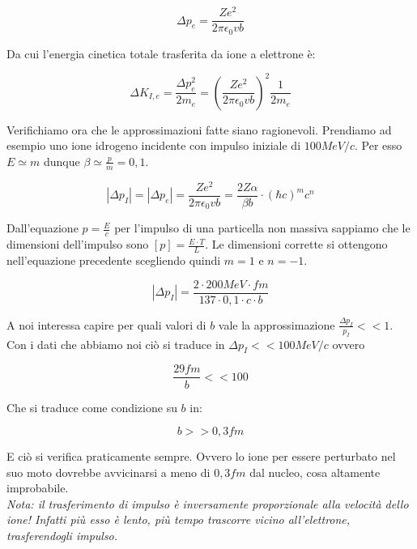 \documentclass [a4paper, twoside] {book}
\begin{document}
\begin{equation}
\Delta p_e=\frac{Ze^2}{2\pi\epsilon_0vb}
\end{equation}

Da cui l'energia cinetica totale trasferita da ione a elettrone è:

\begin{equation}
\Delta K_{I,e}=\frac{\Delta p_e^2}{2m_e}=(\frac{Ze^2}{2\pi\epsilon_0vb})^2\frac{1}{2m_e}
\end{equation}

Verifichiamo ora che le approssimazioni fatte siano ragionevoli. Prendiamo ad esempio uno ione idrogeno incidente con impulso iniziale di $100 MeV/c$. Per esso $E\simeq m$ dunque $\beta\simeq\frac{p}{m}=0,1$.

\begin{equation}
 |\Delta p_I|=|\Delta p_e|=\frac{Ze^2}{2\pi\epsilon_0vb}=\frac{2Z\alpha}{\beta b}\cdot(\hbar c)^mc^n  
\end{equation}

Dall'equazione $p=\frac{E}{c}$ per l'impulso di una particella non massiva sappiamo che le dimensioni dell'impulso sono $[p]=\frac{E\cdot T}{L}$. Le dimensioni corrette si ottengono nell'equazione precedente scegliendo quindi $m=1$ e $n=-1$.

\begin{equation}
|\Delta p_I|=\frac{2\cdot 200 MeV\cdot fm}{137 \cdot 0,1 \cdot c \cdot b}
\end{equation}

A noi interessa capire per quali valori di $b$ vale la approssimazione $\frac{\Delta p_I}{p_I}<<1$. 
Con i dati che abbiamo noi ciò si traduce in $\Delta p_I<<100 MeV/c$ ovvero 

\begin{equation}
\frac{29 fm}{b}<<100
\end{equation}

Che si traduce come condizione su $b$ in:

\begin{equation}
b>>0,3 fm
\end{equation}

E ciò si verifica praticamente sempre. Ovvero lo ione per essere perturbato nel suo moto dovrebbe avvicinarsi a meno di $0,3 fm$ dal nucleo, cosa altamente improbabile.\\

\emph{Nota: il trasferimento di impulso è inversamente proporzionale alla velocità dello ione! Infatti più esso è lento, più tempo trascorre vicino all'elettrone, trasferendogli impulso.}\\
\end{document}

